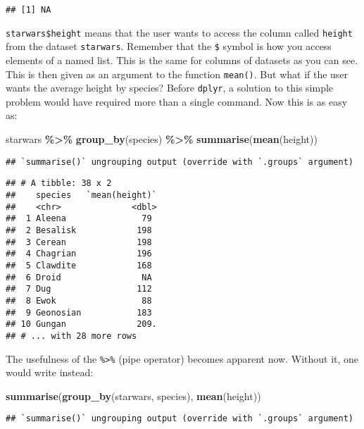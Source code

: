 \documentclass[
]{article}
\newenvironment{Shaded}{\begin{snugshade}}{\end{snugshade}}
\newcommand{\KeywordTok}[1]{\textcolor[rgb]{0.13,0.29,0.53}{\textbf{#1}}}
\newcommand{\NormalTok}[1]{#1}
\newcommand{\OperatorTok}[1]{\textcolor[rgb]{0.81,0.36,0.00}{\textbf{#1}}}
\newcommand{\StringTok}[1]{\textcolor[rgb]{0.31,0.60,0.02}{#1}}
\begin{document}
\begin{verbatim}
## [1] NA
\end{verbatim}

\texttt{starwars\$height} means that the user wants to access the column called \texttt{height} from the dataset
\texttt{starwars}. Remember that the \texttt{\$} symbol is how you access elements of a named list. This is the
same for columns of datasets as you can see. This is then given as an argument to the function
\texttt{mean()}. But what if the user wants the average height by species? Before \texttt{dplyr}, a solution to
this simple problem would have required more than a single command. Now this is as easy as:

\begin{Shaded}
\begin{Highlighting}[]
\NormalTok{starwars }\OperatorTok{\%\textgreater{}\%}
\StringTok{  }\KeywordTok{group\_by}\NormalTok{(species) }\OperatorTok{\%\textgreater{}\%}
\StringTok{  }\KeywordTok{summarise}\NormalTok{(}\KeywordTok{mean}\NormalTok{(height))}
\end{Highlighting}
\end{Shaded}

\begin{verbatim}
## `summarise()` ungrouping output (override with `.groups` argument)
\end{verbatim}

\begin{verbatim}
## # A tibble: 38 x 2
##    species   `mean(height)`
##    <chr>              <dbl>
##  1 Aleena               79 
##  2 Besalisk            198 
##  3 Cerean              198 
##  4 Chagrian            196 
##  5 Clawdite            168 
##  6 Droid                NA 
##  7 Dug                 112 
##  8 Ewok                 88 
##  9 Geonosian           183 
## 10 Gungan              209.
## # ... with 28 more rows
\end{verbatim}

The usefulness of the \texttt{\%\textgreater{}\%} (pipe operator) becomes apparent now. Without it, one would write
instead:

\begin{Shaded}
\begin{Highlighting}[]
\KeywordTok{summarise}\NormalTok{(}\KeywordTok{group\_by}\NormalTok{(starwars, species), }\KeywordTok{mean}\NormalTok{(height))}
\end{Highlighting}
\end{Shaded}

\begin{verbatim}
## `summarise()` ungrouping output (override with `.groups` argument)
\end{verbatim}
\end{document}

